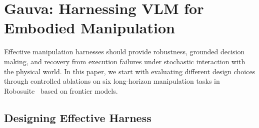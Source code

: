 \section{Gauva: Harnessing VLM for Embodied Manipulation}
\label{sec:method}

Effective manipulation harnesses should provide robustness, grounded decision making, and recovery from execution failures under stochastic interaction with the physical world. In this paper, we start with evaluating different design choices through controlled ablations on six long-horizon manipulation tasks in Robosuite~\citep{robosuite2020} based on frontier models.

\subsection{Designing Effective Harness}
\label{sec:harness}

\begin{table}[t]
\centering
\small
\caption{\textbf{List of embodied tools in Guava.} 
Each tool has clear semantic meaning, some taking in semantic only input while others allow fine-grained actions via numerical parameters. 
}
\label{tab:tools}
\end{table}

